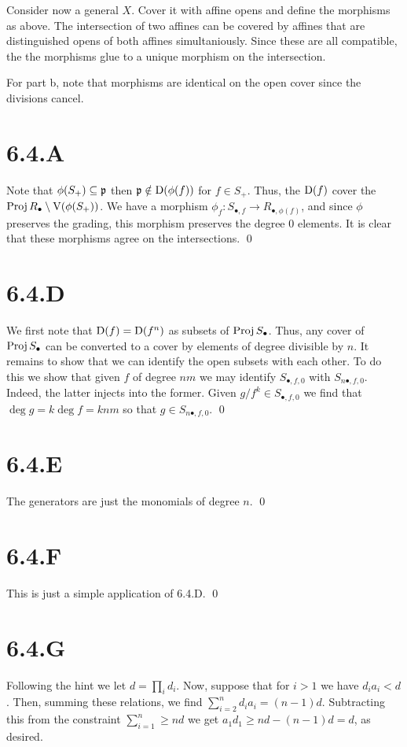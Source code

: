 \documentclass{article}
\begin{document}
Consider now a general $X$. Cover it with affine opens and
define the morphisms as above. The intersection of two affines can be covered
by affines that are distinguished opens of both affines simultaniously. Since
these are all compatible, the the morphisms glue to a unique morphism on the
intersection.

For part b, note that morphisms are identical on the open cover since the
divisions cancel.

\section{6.4.A}
Note that $\phi(S_+) \subseteq \mathfrak{p}$ then $\mathfrak{p} \notin \operatorname{D}(\phi(f))$ for
$f \in S_+$. Thus, the $\operatorname{D}(f)$ cover the
$\operatorname{Proj} R_{\bullet} \setminus \operatorname{V}(\phi(S_+))$. We have a morphism $\phi_f : S_{\bullet, f} \to R_{\bullet, \phi(f)}$, and since
$\phi$ preserves the grading, this morphism preserves the
degree 0 elements. It is clear that these morphisms agree on the intersections.
\qed

\section{6.4.D}
We first note that $\operatorname{D}(f)=\operatorname{D}(f^n)$ as subsets of
$\operatorname{Proj} S_{\bullet}$. Thus, any cover of $\operatorname{Proj} S_{\bullet}$ can be
converted to a cover by elements of degree divisible by
$n$. It remains to show that we can identify the open
subsets with each other. To do this we show that given $f$
of degree $nm$ we may identify $S_{\bullet, f, 0}$ with
$S_{n\bullet, f, 0}$. Indeed, the latter injects into the former. Given
$g/f^k \in S_{\bullet, f, 0}$ we find that $\deg g = k \deg f = knm$ so that
$g \in S_{n\bullet, f, 0}$. \qed

\section{6.4.E}
The generators are just the monomials of degree $n$. \qed

\section{6.4.F}
This is just a simple application of 6.4.D. \qed

\section{6.4.G}
Following the hint we let $d = \prod_i d_i$. Now, suppose that for
$i > 1$ we have $d_ia_i < d$. Then, summing these
relations, we find $\sum_{i=2}^n d_ia_i=(n-1)d$. Subtracting this from the
constraint $\sum_{i=1}^n \geq nd$ we get $a_1d_1 \geq nd-(n-1)d = d$, as desired.
\end{document}

